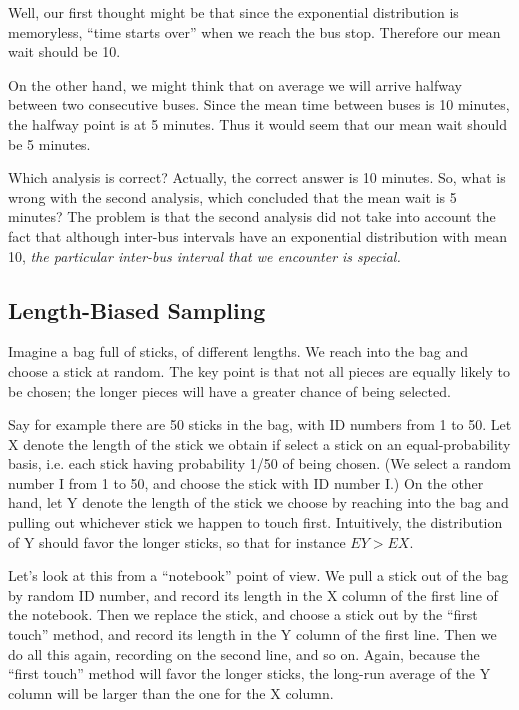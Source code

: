 Well, our first thought might be that since the exponential distribution
is memoryless, ``time starts over'' when we reach the bus stop.
Therefore our mean wait should be 10.

On the other hand, we might think that on average we will arrive halfway
between two consecutive buses. Since the mean time between buses is 10
minutes, the halfway point is at 5 minutes. Thus it would seem that our
mean wait should be 5 minutes.

Which analysis is correct? Actually, the correct answer is 10 minutes.
So, what is wrong with the second analysis, which concluded that the
mean wait is 5 minutes?  The problem is that the second analysis did not
take into account the fact that although inter-bus intervals have an
exponential distribution with mean 10, \textit{the particular inter-bus
interval that we encounter is special.}

\subsection{Length-Biased Sampling}
\label{lbsamp}

Imagine a bag full of sticks, of different lengths. We reach into the
bag and choose a stick at random. The key point is that not all pieces
are equally likely to be chosen; the longer pieces will have a greater
chance of being selected.

Say for example there are 50 sticks in the bag, with ID numbers from 1
to 50.  Let X denote the length of the stick we obtain if select a stick
on an equal-probability basis, i.e. each stick having probability 1/50
of being chosen.  (We select a random number I from 1 to 50, and choose
the stick with ID number I.)  On the other hand, let Y denote the length
of the stick we choose by reaching into the bag and pulling out
whichever stick we happen to touch first.  Intuitively, the distribution
of Y should favor the longer sticks, so that for instance $EY > EX$.

Let's look at this from a ``notebook'' point of view.  We pull a stick
out of the bag by random ID number, and record its length in the X
column of the first line of the notebook.  Then we replace the stick,
and choose a stick out by the ``first touch'' method, and record its
length in the Y column of the first line.  Then we do all this again,
recording on the second line, and so on.  Again, because the ``first
touch'' method will favor the longer sticks, the long-run average of the
Y column will be larger than the one for the X column.


